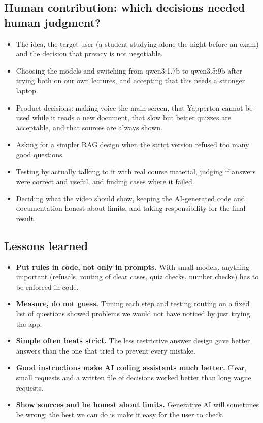 \documentclass[11pt,a4paper]{article}
\begin{document}
\subsection*{Human contribution: which decisions needed human judgment?}

\begin{itemize}[leftmargin=*]
  \item The idea, the target user (a student studying alone the night before
        an exam) and the decision that privacy is not negotiable.
  \item Choosing the models and switching from qwen3:1.7b to qwen3.5:9b after
        trying both on our own lectures, and accepting that this needs a
        stronger laptop.
  \item Product decisions: making voice the main screen, that Yapperton cannot
        be used while it reads a new document, that slow but better quizzes are
        acceptable, and that sources are always shown.
  \item Asking for a simpler RAG design when the strict version refused too
        many good questions.
  \item Testing by actually talking to it with real course material, judging
        if answers were correct and useful, and finding cases where it failed.
  \item Deciding what the video should show, keeping the AI-generated code and
        documentation honest about limits, and taking responsibility for the
        final result.
\end{itemize}

\subsection*{Lessons learned}

\begin{itemize}[leftmargin=*]
  \item \textbf{Put rules in code, not only in prompts.} With small models,
        anything important (refusals, routing of clear cases, quiz checks,
        number checks) has to be enforced in code.
  \item \textbf{Measure, do not guess.} Timing each step and testing routing on
        a fixed list of questions showed problems we would not have noticed by
        just trying the app.
  \item \textbf{Simple often beats strict.} The less restrictive answer design
        gave better answers than the one that tried to prevent every mistake.
  \item \textbf{Good instructions make AI coding assistants much better.} Clear,
        small requests and a written file of decisions worked better than long
        vague requests.
  \item \textbf{Show sources and be honest about limits.} Generative AI will
        sometimes be wrong; the best we can do is make it easy for the user to
        check.
\end{itemize}
\end{document}
